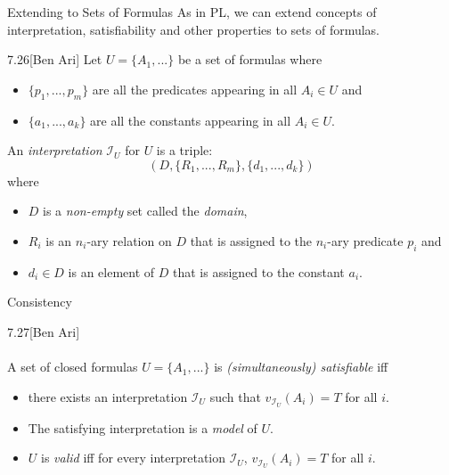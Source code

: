 \begin{wideslide}[bm=,toc=]{Extending to Sets of Formulas}
As in PL, we can extend concepts of interpretation, satisfiability and other
properties to sets of formulas.
\pause
\begin{defn}{7.26}[Ben Ari]
Let $U = \{A_1,...\}$ be a set of formulas where 
\begin{itemize}
\item<3-> $\{p_1,...,p_m\}$ are all the predicates appearing in all $A_i \in U$ and
\item<4-> $\{a_1,...,a_k\}$ are all the constants appearing in all $A_i \in U$. 
\end{itemize}
\pause[3]
An \emph{interpretation} $\mathcal{I}_U$ for $U$ is a triple:
\[(D, \{R_1,...,R_m\},\{d_1,...,d_k\})\]
\pause
where 
\begin{itemize}
\item<6-> $D$ is a \emph{non-empty} set called the \emph{domain}, 
\item<7-> $R_i$ is an $n_i$-ary relation on $D$ that is assigned to the $n_i$-ary predicate $p_i$ and 
\item<8-> $d_i \in D$ is an element of $D$ that is assigned to the constant $a_i$.
\end{itemize}
\end{defn}

\end{wideslide}

\begin{wideslide}[bm=,toc=]{Consistency}
\begin{defn}{7.27}[Ben Ari]~\\~\\
A set of closed formulas $U = \{A_1,...\}$ is \emph{(simultaneously)
  satisfiable} iff 
\begin{itemize}
\item<2-> there exists an interpretation $\mathcal{I}_U$ such that $v_{\mathcal{I}_U}(A_i) = T$ for all $i$. 
\item<3-> The satisfying interpretation is a \emph{model} of $U$.
\item<4-> $U$ is \emph{valid} iff for every interpretation
  $\mathcal{I}_U$, $v_{\mathcal{I}_U}(A_i) = T$ for all $i$.
\end{itemize}
\end{defn}
\end{wideslide}


